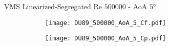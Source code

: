 \begin{frame}{VMS Linearized-Segregated}
Re $\num{500000}$ - AoA $\ang{5}$ 
\begin{figure}[h]
     \centering          
     \begin{subfigure}[h]{0.45\textwidth}
              \centering
         \texttt{[image: DU89\_500000\_AoA\_5\_Cf.pdf]}
    \end{subfigure}
          \hfill
     \begin{subfigure}[h]{0.45\textwidth}
      \centering
         \texttt{[image: DU89\_500000\_AoA\_5\_Cp.pdf]}
     \end{subfigure}
     \end{figure} 
 \end{frame}

